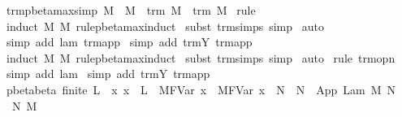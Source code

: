 \begin{isabellebody}
\isanewline
{}\isamarkupfalse%
\ trm{\isacharunderscore}pbeta{\isacharunderscore}max{\isacharunderscore}simp{}{\isacharcolon}\ {\isachardoublequoteopen}M\ {\isachargreater}{\isachargreater}{\isachargreater}\ M{\isacharprime}\ {\isasymLongrightarrow}\ trm\ M\ {\isasymand}\ trm\ M{\isacharprime}{\isachardoublequoteclose}\isanewline
%
\isadelimproof
%
\endisadelimproof
%
\isatagproof
{}\isamarkupfalse%
\ rule\isanewline
{}\isamarkupfalse%
\ {\isacharparenleft}induct\ M\ M{\isacharprime}\ rule{\isacharcolon}pbeta{\isacharunderscore}max{\isachardot}induct{\isacharparenright}\isanewline
{}\isamarkupfalse%
\ {\isacharparenleft}subst\ trm{\isachardot}simps{\isacharcomma}\ simp{\isacharparenright}{\isacharplus}\isanewline
{}\isamarkupfalse%
\ auto{\isacharbrackleft}{}{\isacharbrackright}\isanewline
{}\isamarkupfalse%
\ {\isacharparenleft}simp\ add{\isacharcolon}\ lam\ trm{\isachardot}app{\isacharparenright}\isanewline
{}\isamarkupfalse%
\ {\isacharparenleft}simp\ add{\isacharcolon}\ trm{\isachardot}Y\ trm{\isachardot}app{\isacharparenright}\isanewline
{}\isamarkupfalse%
\ {\isacharparenleft}induct\ M\ M{\isacharprime}\ rule{\isacharcolon}pbeta{\isacharunderscore}max{\isachardot}induct{\isacharparenright}\isanewline
{}\isamarkupfalse%
\ {\isacharparenleft}subst\ trm{\isachardot}simps{\isacharcomma}\ simp{\isacharparenright}{\isacharplus}\isanewline
{}\isamarkupfalse%
\ auto{\isacharbrackleft}{}{\isacharbrackright}\isanewline
{}\isamarkupfalse%
\ {\isacharparenleft}rule\ trm{\isacharunderscore}opn{\isacharparenright}\isanewline
{}\isamarkupfalse%
\ {\isacharparenleft}simp\ add{\isacharcolon}\ lam{\isacharparenright}\isanewline
{}\isamarkupfalse%
\ {\isacharparenleft}simp\ add{\isacharcolon}\ trm{\isachardot}Y\ trm{\isachardot}app{\isacharparenright}\isanewline
{}\isamarkupfalse%
%
\endisatagproof
{\isafoldproof}%
%
\isadelimproof
\isanewline
%
\endisadelimproof
\isanewline
{}\isamarkupfalse%
\ pbeta{\isacharunderscore}beta{\isacharprime}{\isacharcolon}\ {\isachardoublequoteopen}finite\ L\ {\isasymLongrightarrow}\ {\isacharparenleft}{\isasymAnd}x{\isachardot}\ x\ {\isasymnotin}\ L\ {\isasymLongrightarrow}\ M{\isacharcircum}{\isacharparenleft}FVar\ x{\isacharparenright}\ {\isasymggreater}\ M{\isacharprime}{\isacharcircum}{\isacharparenleft}FVar\ x{\isacharparenright}{\isacharparenright}\ {\isasymLongrightarrow}\ N\ {\isasymggreater}\ N{\isacharprime}\ {\isasymLongrightarrow}\ App\ {\isacharparenleft}Lam\ M{\isacharparenright}\ N\ {\isasymggreater}\ {\isacharbraceleft}{}\ {\isasymrightarrow}\ N{\isacharprime}{\isacharbraceright}\ M{\isacharprime}{\isachardoublequoteclose}\ \isanewline

\end{isabellebody}
